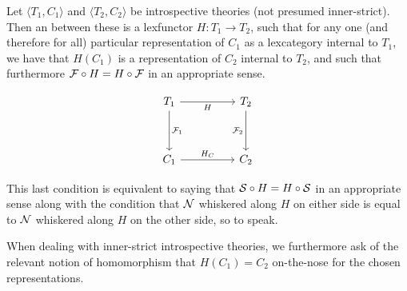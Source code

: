\documentclass[./main.tex]{subfiles}
\begin{document}
\begin{definition}
Let $\langle T_1, C_1 \rangle$ and $\langle T_2, C_2 \rangle$ be introspective theories (not presumed inner-strict). Then an  between these is a lexfunctor $H : T_1 \to T_2$, such that for any one (and therefore for all) particular representation of $C_1$ as a lexcategory internal to $T_1$, we have that $H(C_1)$ is a representation of $C_2$ internal to $T_2$, and such that furthermore $\mathcal{F} \circ H = H \circ \mathcal{F}$ in an appropriate sense.

\[\begin{tikzcd}
	{T_1} && {T_2} \\
	\\
	{C_1} && {C_2}
	\arrow["{\introF_1}", from=1-1, to=3-1]
	\arrow["H"', from=1-1, to=1-3]
	\arrow["{\introF_2}"', from=1-3, to=3-3]
	\arrow["{H_C}", from=3-1, to=3-3]
\end{tikzcd}\]

This last condition is equivalent to saying that $\mathcal{S} \circ H = H \circ \mathcal{S}$ in an appropriate sense along with the condition that $\mathcal{N}$ whiskered along $H$ on either side is equal to $\mathcal{N}$ whiskered along $H$ on the other side, so to speak. 

When dealing with inner-strict introspective theories, we furthermore ask of the relevant notion of homomorphism that $H(C_1) = C_2$ on-the-nose for the chosen representations.

\end{definition}
\end{document}
